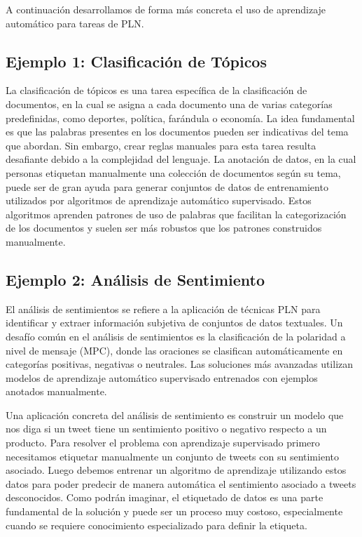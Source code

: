 A continuación desarrollamos de forma más concreta el uso de aprendizaje automático para tareas de PLN.

\subsection{Ejemplo 1: Clasificación de Tópicos}

La clasificación de tópicos es una tarea específica de la clasificación de documentos, en la cual se asigna a cada documento una de varias categorías predefinidas, como deportes, política, farándula o economía. La idea fundamental es que las palabras presentes en los documentos pueden ser indicativas del tema que abordan. Sin embargo, crear reglas manuales para esta tarea resulta desafiante debido a la complejidad del lenguaje. La anotación de datos, en la cual personas etiquetan manualmente una colección de documentos según su tema, puede ser de gran ayuda para generar conjuntos de datos de entrenamiento utilizados por algoritmos de aprendizaje automático supervisado. Estos algoritmos aprenden patrones de uso de palabras que facilitan la categorización de los documentos y suelen ser más robustos que los patrones construidos manualmente.


\subsection{Ejemplo 2: Análisis de Sentimiento}

El análisis de sentimientos se refiere a la aplicación de técnicas PLN para identificar y extraer información subjetiva de conjuntos de datos textuales. Un desafío común en el análisis de sentimientos es la clasificación de la polaridad a nivel de mensaje (MPC), donde las oraciones se clasifican automáticamente en categorías positivas, negativas o neutrales. Las soluciones más avanzadas utilizan modelos de aprendizaje automático supervisado entrenados con ejemplos anotados manualmente.

Una aplicación concreta del análisis de sentimiento es construir un modelo que nos diga si un tweet tiene un sentimiento positivo o negativo respecto a un producto. Para resolver el problema con aprendizaje supervisado primero necesitamos etiquetar manualmente un conjunto de tweets con su sentimiento asociado. Luego debemos entrenar un algoritmo de aprendizaje utilizando estos datos para poder predecir de manera automática el sentimiento asociado a tweets desconocidos. Como podrán imaginar, el etiquetado de datos es una parte fundamental de la solución y puede ser un proceso muy costoso, especialmente cuando se requiere conocimiento especializado para definir la etiqueta.

